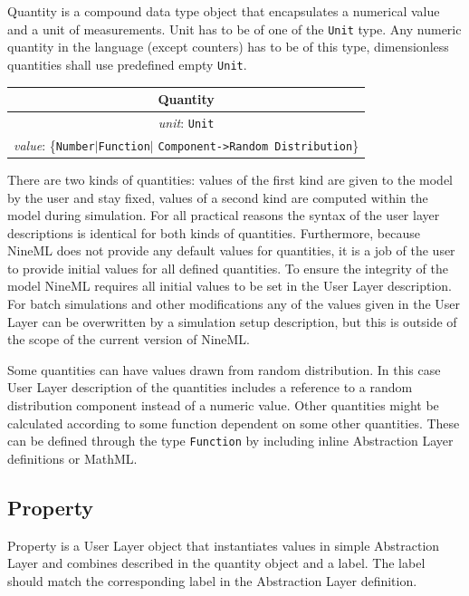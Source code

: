 \documentclass[draftspec]{ninemlspec}
\newcommand{\Parameter}{\textbf{\class{Parameter}}\xspace}
\begin{document}
Quantity is a compound data type object that encapsulates a numerical value
and a unit of measurements. Unit has to be of one of the {\tt Unit} type.
Any numeric quantity in the language (except counters) has to be of this type,
dimensionless quantities shall use predefined empty {\tt Unit}.

\begin{table}[htb]
\center
\begin{tabular}{|c|}
\hline
\hline
Quantity \\
\hline
\hline
{\em unit}: {\tt Unit} \\
\hline
{\em value}: \{{\tt Number}$|${\tt Function}$|$%
{\tt Component->Random Distribution}\} \\
\hline
\end{tabular}
\end{table}

There are two kinds of quantities: values of the first kind are given to the
model by the user and stay fixed, values of a second kind are computed within
the model during simulation. For all practical reasons the syntax of the user
layer descriptions is identical for both kinds of quantities. Furthermore,
because NineML does not provide any default values for quantities, it is a
job of the user to provide initial values for all defined quantities. To
ensure the integrity of the model NineML requires all initial values to be
set in the User Layer description. For batch simulations and other
modifications any of the values given in the User Layer can be overwritten
by a simulation setup description, but this is outside of the scope of the
current version of NineML.

Some quantities can have values drawn from random distribution. In
this case User Layer description of the quantities includes a
reference to a random distribution component instead of a numeric
value.  Other quantities might be calculated according to some
function dependent on some other quantities. These can be defined
through the type {\tt Function} by including inline Abstraction Layer
definitions or MathML.

\subsection{Property}

Property is a User Layer object that instantiates values in simple
Abstraction Layer \Parameter and combines described in the quantity object
and a label. The label should match the corresponding label in the
Abstraction Layer \Parameter definition.
\end{document}
